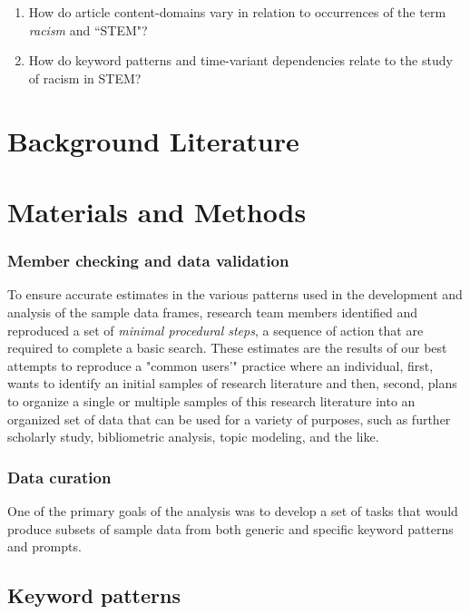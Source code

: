 \begin{enumerate}

\item{How do article content-domains vary in relation to occurrences of the term \textit{racism} and ``STEM"?}

\item{How do keyword patterns and time-variant dependencies relate to the study of racism in STEM?}

\end{enumerate}

\section{Background Literature}
\label{sec:lit}


\section{Materials and Methods}
\label{sec:methods}

\subsubsection{Member checking and data validation}

To ensure accurate estimates in the various patterns used in the development and analysis of the sample data frames, research team members identified and reproduced a set of \textit{minimal procedural steps}, a sequence of action that are required to complete a basic search. These estimates are the results of our best attempts to reproduce a "common users'" practice where an individual, first, wants to identify an initial samples of research literature and then, second, plans to organize a single or multiple samples of this research literature into an organized set of data that can be used for a variety of purposes, such as further scholarly study, bibliometric analysis, topic modeling, and the like.

\subsubsection{Data curation}

One of the primary goals of the analysis was to develop a set of tasks that would produce subsets of sample data from both generic and specific keyword patterns and prompts.

\subsection{Keyword patterns}

